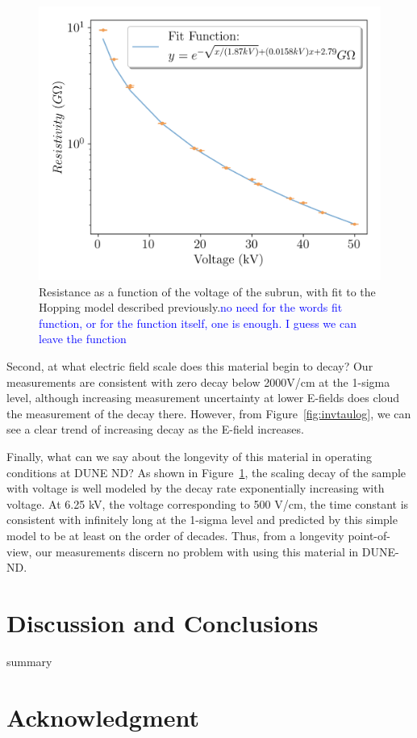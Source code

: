 \documentclass[a4paper,12pt]{article}
\newcommand{\RI}[1]{\textcolor{blue}{#1}}
\begin{document}
\begin{figure}
	\begin{center}
		
		\includegraphics[width=0.75\linewidth]{Efield_Z.png}
		\caption{Resistance as a function of the voltage of the subrun, with fit to the Hopping model described previously.\RI{no need for the words fit function, or for the function itself, one is enough. I guess we can leave the function}} 
		\label{fig:resvsvol}
	\end{center}
\end{figure}


Second, at what electric field scale does this material begin to decay? Our measurements are consistent with zero decay below 2000V/cm at the 1-sigma level, although increasing measurement uncertainty at lower E-fields does cloud the measurement of the decay there. However, from Figure~\ref{fig:invtaulog}, we can see a clear trend of increasing decay as the E-field increases.


Finally, what can we say about the longevity of this material in operating conditions at DUNE ND?
As shown in Figure~\ref{fig:resvsvol}, the scaling decay of the sample with voltage is well modeled by the  decay rate exponentially increasing with voltage. At 6.25 kV, the voltage corresponding to 500 V/cm, the time constant is consistent with infinitely long at the 1-sigma level and predicted by this simple model to be at least on the order of decades. Thus, from a longevity point-of-view, our measurements discern no problem with using this material in DUNE-ND.


\section{Discussion and Conclusions}
\label{sec:sum}

summary

\section{Acknowledgment} 



\clearpage


\end{document}
